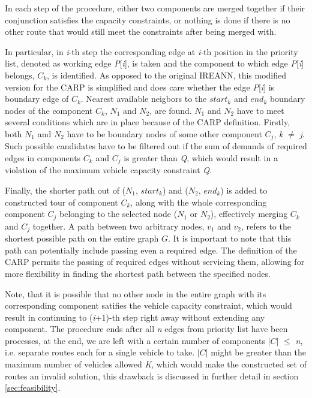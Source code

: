 \documentclass[twoside]{ctuthesis}
\theoremstyle{plain}
\theoremstyle{definition}
\theoremstyle{note}
\begin{document}
In each step of the procedure, either two components are merged together if their conjunction satisfies the capacity constraints, or nothing is done if there is no other route that would still meet the constraints after being merged with.

In particular, in \emph{i}-th step the corresponding edge at \emph{i}-th position in the priority list, denoted as working edge \emph{P}[\emph{i}], is taken and the component to which edge \emph{P}[\emph{i}] belongs, \emph{$C_k$}, is identified. As opposed to the original IREANN, this modified version for the CARP is simplified and does care whether the edge \emph{P}[\emph{i}] is boundary edge of \emph{$C_k$}. Nearest available neigbors to the \emph{$start_k$} and \emph{$end_k$} boundary nodes of the component \emph{$C_k$}, \emph{$N_1$} and \emph{$N_2$}, are found. \emph{$N_1$} and \emph{$N_2$} have to meet several conditions which are in place because of the CARP definition. Firstly, both \emph{$N_1$} and \emph{$N_2$} have to be boundary nodes of some other component \emph{$C_j$}, \emph{k} $\neq$ \emph{j}. Such possible candidates have to be filtered out if the sum of demands of required edges in components \emph{$C_k$} and \emph{$C_j$} is greater than \emph{Q}, which would result in a violation of the maximum vehicle capacity constraint \emph{Q}. 

Finally, the shorter path out of (\emph{$N_1$}, \emph{$start_k$}) and (\emph{$N_2$}, \emph{$end_k$}) is added to constructed tour of component \emph{$C_k$}, along with the whole corresponding component \emph{$C_j$} belonging to the selected node (\emph{$N_1$} or \emph{$N_2$}), effectively merging \emph{$C_k$} and \emph{$C_j$} together. A path between two arbitrary nodes, $v_1$ and $v_2$, refers to the shortest possible path on the entire graph $G$. It is important to note that this path can potentially include passing even a required edge. The definition of the CARP permits the passing of required edges without servicing them, allowing for more flexibility in finding the shortest path between the specified nodes.

Note, that it is possible that no other node in the entire graph with its corresponding component satifies the vehicle capacity constraint, which would result in continuing to (\emph{i}+1)-th step right away without extending any component. The procedure ends after all \emph{n} edges from priority list have been processes, at the end, we are left with a certain number of components \emph{$|C|$} $\leq$ \emph{n}, i.e. separate routes each for a single vehicle to take. \emph{$|C|$} might be greater than the maximum number of vehicles allowed \emph{K}, which would make the constructed set of routes an invalid solution, this drawback is discussed in further detail in section \ref{sec:feasibility}.
\end{document}
